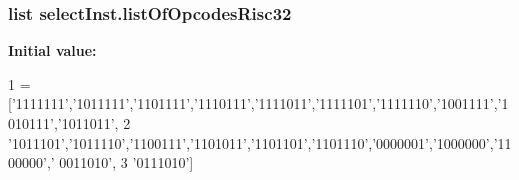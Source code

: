 \subsubsection[{\texorpdfstring{list\+Of\+Opcodes\+Risc32}{listOfOpcodesRisc32}}]{\setlength{\rightskip}{0pt plus 5cm}list select\+Inst.\+list\+Of\+Opcodes\+Risc32}\hypertarget{namespaceselectInst_a40746ca54092d38fb6845d6434e00fe6}{}\label{namespaceselectInst_a40746ca54092d38fb6845d6434e00fe6}
{\bfseries Initial value\+:}
\begin{DoxyCode}
1 = [\textcolor{stringliteral}{'1111111'},\textcolor{stringliteral}{'1011111'},\textcolor{stringliteral}{'1101111'},\textcolor{stringliteral}{'1110111'},\textcolor{stringliteral}{'1111011'},\textcolor{stringliteral}{'1111101'},\textcolor{stringliteral}{'1111110'},\textcolor{stringliteral}{'1001111'},\textcolor{stringliteral}{'1010111'},\textcolor{stringliteral}{'1011011'},
2                 \textcolor{stringliteral}{'1011101'},\textcolor{stringliteral}{'1011110'},\textcolor{stringliteral}{'1100111'},\textcolor{stringliteral}{'1101011'},\textcolor{stringliteral}{'1101101'},\textcolor{stringliteral}{'1101110'},\textcolor{stringliteral}{'0000001'},\textcolor{stringliteral}{'1000000'},\textcolor{stringliteral}{'1100000'},\textcolor{stringliteral}{'
      0011010'}, 
3                 \textcolor{stringliteral}{'0111010'}]
\end{DoxyCode}
